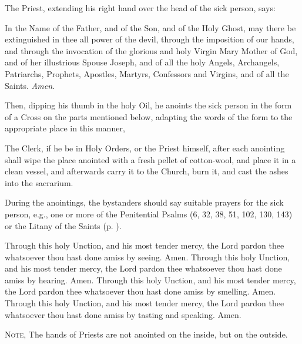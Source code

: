 \begin{rubric}
    The Priest, extending his right hand over the head of the sick person, says:
\end{rubric}\par\noindent
In the Name of the {} Father, and of the {} Son, and of the {} Holy Ghost, may there be extinguished in thee all power of the devil, through the imposition of our hands, and through the invocation of the glorious and holy Virgin Mary Mother of God, and of her illustrious Spouse Joseph, and of all the holy Angels, Archangels, Patriarchs, Prophets, Apostles, Martyrs, Confessors and Virgins, and of all the Saints. \textit{Amen.}
\begin{rubric}
    Then, dipping his thumb in the holy Oil, he anoints the sick person in the form of a Cross on the parts mentioned below, adapting the words of the form to the appropriate place in this manner,
\end{rubric}
\begin{rubric}
    The Clerk, if he be in Holy Orders, or the Priest himself, after each anointing shall wipe the place anointed with a fresh pellet of cotton-wool, and place it in a clean vessel, and afterwards carry it to the Church, burn it, and cast the ashes into the sacrarium.
\end{rubric}
\begin{rubric}
    During the anointings, the bystanders should say suitable prayers for the sick person, e.g., one or more of the Penitential Psalms (6, 32, 38, 51, 102, 130, 143) or the Litany of the Saints (p. \pageref{LitanySaints}).
\end{rubric}
\noindent
Through this holy {} Unction, and his most tender mercy, the Lord pardon thee whatsoever thou hast done amiss by seeing. Amen.
\noindent
Through this holy {} Unction, and his most tender mercy, the Lord pardon thee whatsoever thou hast done amiss by hearing. Amen.
\noindent
Through this holy {} Unction, and his most tender mercy, the Lord pardon thee whatsoever thou hast done amiss by smelling. Amen.
\noindent
Through this holy {} Unction, and his most tender mercy, the Lord pardon thee whatsoever thou hast done amiss by tasting and speaking. Amen.
\begin{rubric}
    \textsc{Note,} The hands of Priests are not anointed on the inside, but on the outside.
\end{rubric}\par\noindent
